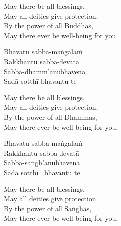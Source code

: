 \begin{english-verses}
  May there be all blessings.\\
  May all deities give protection.\\
  By the power of all Buddhas,\\
  May there ever be well-being for you.
\end{english-verses}

\begin{pali-hang-continued}
  Bhavatu sabba-maṅgalaṁ\\
  Rakkhantu sabba-devatā\\
  Sabba-dhamm'ānubhāvena\\
  Sadā sotthī bhavantu te
\end{pali-hang-continued}

\begin{english-verses}
  May there be all blessings.\\
  May all deities give protection.\\
  By the power of all Dhammas,\\
  May there ever be well-being for you.
\end{english-verses}

\begin{pali-hang-continued}
  Bhavatu sabba-maṅgalaṁ\\
  Rakkhantu sabba-devatā\\
  Sabba-saṅgh'ānubhāvena\\
  Sadā sotthī \breathmark\ bhavantu te
\end{pali-hang-continued}

\begin{english-verses}
  May there be all blessings.\\
  May all deities give protection.\\
  By the power of all Saṅghas,\\
  May there ever be well-being for you.
\end{english-verses}

\suttaRef{[Trad]}

